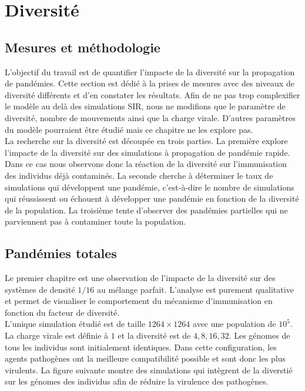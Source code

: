 \chapter{Diversité} \label{ch:DIV}

\section{Mesures et méthodologie}

L'objectif du travail est de quantifier l'impacte de la diversité sur la propagation de pandémies. Cette section est dédié à la prises de mesures avec des niveaux de diversité différents et d'en constater les résultats. Afin de ne pas trop complexifier le modèle au delà des simulations SIR, nous ne modifions que le paramètre de diversité, nombre de mouvements ainsi que la charge virale. D'autres paramètres du modèle pourraient être étudié mais ce chapitre ne les explore pas.\\

La recherche sur la diversité est découpée en trois parties. La première explore l'impacte de la diversité sur des simulations à propagation de pandémie rapide. Dans ce cas nous observons donc la réaction de la diversité sur l'immunisation des individus déjà contaminés. La seconde cherche à déterminer le taux de simulations qui développent une pandémie, c'est-à-dire le nombre de simulations qui réussissent ou échouent à développer une pandémie en fonction de la diversité de la population. La troisième tente d'observer des pandémies partielles qui ne parviennent pas à contaminer toute la population.\\


\section{Pandémies totales}

Le premier chapitre est une observation de l'impacte de la diversité sur des systèmes de densité $1/16$ au mélange parfait. L'analyse est purement qualitative et permet de visualiser le comportement du mécanisme d'immunisation en fonction du facteur de diversité.\\

L'unique simulation étudié est de taille $1264 \times 1264$ avec une population de $10^5$. La charge virale est définie à $1$ et la diversité est de $4,8,16,32$. Les génomes de tous les individus sont initialement identiques. Dans cette configuration, les agents pathogènes ont la meilleure compatibilité possible et sont donc les plus virulents. La figure suivante montre des simulations qui intègrent de la diverstié sur les génomes des individus afin de réduire la virulence des pathogènes.

